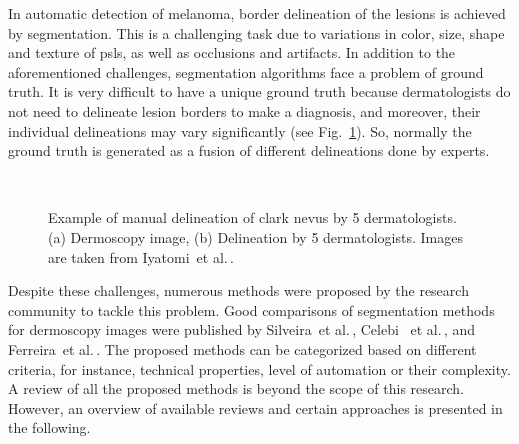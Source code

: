 In automatic detection of melanoma, border delineation of the lesions is achieved by segmentation.
This is a challenging task due to variations in color, size, shape and texture of \ac{psls}, as well as occlusions and artifacts. 
In addition to the aforementioned challenges, segmentation algorithms face a problem of ground truth.  
It is very difficult to have a unique ground truth because dermatologists do not need to delineate lesion borders to make a diagnosis, and moreover, their individual delineations may vary significantly (see Fig.~\ref{fig:GTproblem}). 
So, normally the ground truth is generated as a fusion of different delineations done by experts. 
\begin{figure}
\centering
{}\	
\caption[Lesion delineation variations]{Example of manual delineation of clark nevus by 5 dermatologists. (a) Dermoscopy image, (b) Delineation by 5 dermatologists. Images are taken from Iyatomi~et al.\,\cite{Iyatomi2006}.}
\label{fig:GTproblem}
\end{figure}
Despite these challenges, numerous methods were proposed by the research community to tackle this problem.
Good comparisons of segmentation methods for dermoscopy images were published by Silveira~et al.\,\cite{silveira2009comparison}, Celebi ~et al.\,\cite{Celebi2009a}, and Ferreira~et al.\,\cite{ferreira2013wide}.  %
The proposed methods can be categorized based on different criteria, for instance, technical properties, level of automation or their complexity.
A review of all the proposed methods is beyond the scope of this research. 
However, an overview of available reviews and certain approaches is presented in the following.

